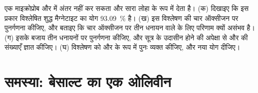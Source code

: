 \begin{exercise}[$\star\star\star$]\label{exo:b1:rock-forming-minerals:12}
एक माइक्रोप्रोब  और  में अंतर नहीं कर सकता और सारा लोहा  के रूप में देता है। (क) दिखाइए
कि इस प्रकार विश्लेषित शुद्ध मैग्नेटाइट  का योग \qty{93.09}{\percent} है। (ख) इस विश्लेषण की चार ऑक्सीजन पर
पुनर्गणना कीजिए, और बताइए कि चार ऑक्सीजन पर तीन धनायन वाले  के लिए परिणाम क्यों असंभव है। (ग) इसके बजाय तीन
धनायनों पर पुनर्गणना कीजिए, और सूत्र के उदासीन होने की अपेक्षा से  और  की संख्याएँ ज्ञात कीजिए।
(घ) विश्लेषण को  और  के रूप में पुनः व्यक्त कीजिए, और नया योग दीजिए।
\end{exercise}

\section{समस्या: बेसाल्ट का एक ओलिवीन}

